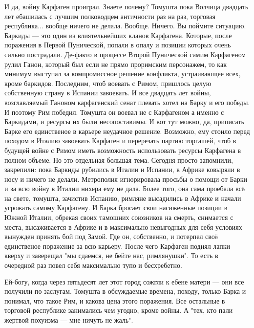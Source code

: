 И да, войну Карфаген проиграл. Знаете почему? Томушта пока Волчица двадцать лет ебашилась с лучшим полководцем античности раз на раз, торговая республика... вообще ничего не делала. Вообще. Ничего. Вы поймите ситуацию. Баркиды — это один из влиятельнейших кланов Карфагена. Которые, после поражения в Первой Пунической, попали в опалу и позиции которых очень сильно пострадали. Де-факто в процессе Второй Пунической самим Карфагеном рулил Ганон, который был если не прямо проримским персонажем, то как минимум выступал за компромиссное решение конфликта, устраивающее всех, кроме баркидов. Последним, чтоб воевать с Римом, пришлось целую собственную страну в Испании завоевать. И все двадцать лет войны, возглавляемый Ганоном карфагенский сенат плевать хотел на Барку и его победы. И поэтому Рим победил. Томушта он воевал не с Карфагеном а именно с Баркидами, и ресурсы их были несопоставимы. И вот тут можно, да, приписать Барке его единственое в карьере неудачное решение. Возможно, ему стоило перед походом в Италию завоевать Карфаген и перерезать партию торгашей, чтоб в будущей войне с Римом иметь возможность использовать ресурсы Карфагена в полном объеме. Но это отдельная большая тема. Сегодня просто запомнили, закрепили: пока Баркиды рубились в Италии и Испании, в Африке ковыряли в носу и ничего не делали. Метрополия игнорировала просьбы о помощи от Барки и за всю войну в Италии нихера ему не дала. Более того, она сама проебала всë на свете, томушта, зачистив Испанию, римляне высадились в Африке и начали угрожать самому Карфагену. И Барка бросает свои насиженные позиции в Южной Италии, обрекая своих тамошних союзников на смерть, снимается с места, высаживается в Африке и в максимально невыгодных для себя условиях вынужден принять бой под Замой. Где он, собственно, и потерпел своë единственое поражение за всю карьеру. После чего Карфаген поднял лапки кверху и заверещал "мы сдаемся, не бейте нас, римлянушки". То есть в очередной раз повел себя максимально тупо и бесхребетно.


Ей-богу, когда через пятьдесят лет этот город сожгли к ебене матери — они все получили по заслугам. Томушта в обсуждаемые времена, походу, только Барка и понимал, что такое Рим, и какова цена этого поражения. Все остальные в торговой республике занимались чем угодно, кроме войны. А "тех, кто пали жертвой похуизма — мне ничуть не жаль".

